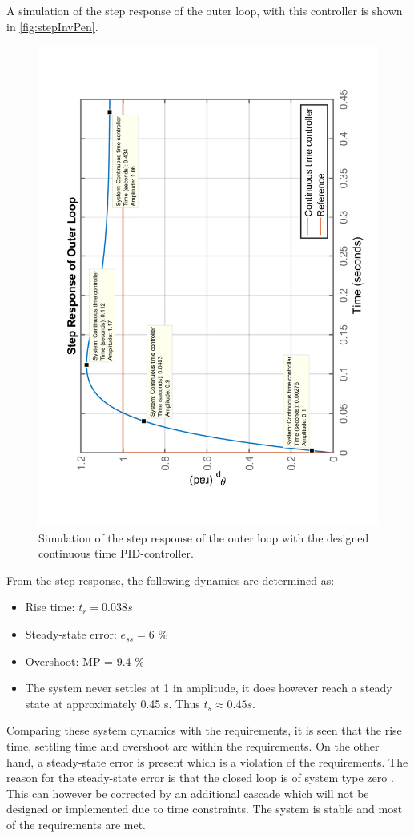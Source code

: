 A simulation of the step response of the outer loop, with this controller is shown in \autoref{fig:stepInvPen}.
\begin{figure}[H]
\centering
\includegraphics[height=\textwidth,angle = -90]{figures/invPenStep.pdf}
\caption{Simulation of the step response of the outer loop with the designed continuous time PID-controller.}
\label{fig:stepInvPen}
\end{figure}

From the step response, the following dynamics are determined as:
\begin{itemize}
\item Rise time: $t_r = 0.038 s$
\item Steady-state error: $e_{ss} = 6$ \%
\item Overshoot: MP = 9.4 \%
\item The system never settles at 1 in amplitude, it does however reach a steady state at approximately 0.45 s. Thus $t_s \approx 0.45 s$.
\end{itemize} 

Comparing these system dynamics with the requirements, it is seen that the rise time, settling time and overshoot are within the requirements. On the other hand, a steady-state error is present which is a violation of the requirements. The reason for the steady-state error is that the closed loop is of system type zero \citep[p. 211]{sou:Feedback}. This can however be corrected by an additional cascade which will not be designed or implemented due to time constraints. The system is stable and most of the requirements are met. 

